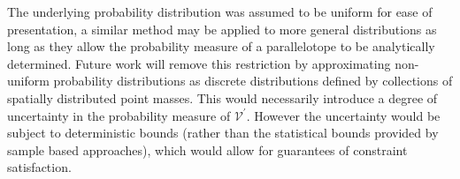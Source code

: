 \documentclass{ifacconf}
\providecommand{\V}{\mathcal V}
\begin{document}
The underlying probability distribution was assumed to be uniform for ease of presentation, a similar method may be applied to more general distributions as long as they allow the probability measure of a parallelotope to be analytically determined.
%
Future work will remove this restriction by approximating non-uniform probability distributions as discrete distributions defined by collections of spatially distributed point masses.
%
This would necessarily introduce a degree of uncertainty in the probability measure of $\V^\prime$. However the uncertainty would be subject to deterministic bounds (rather than the statistical bounds provided by sample based approaches), which would allow for guarantees of constraint satisfaction. 



%

\end{document}
